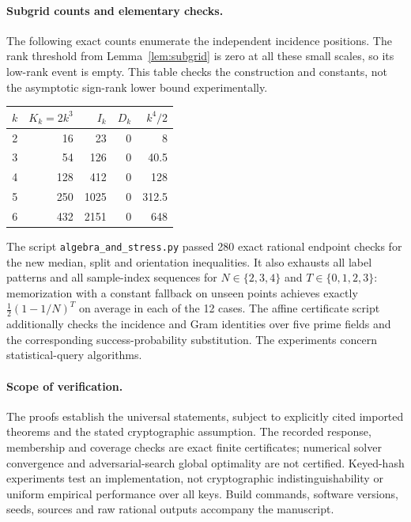 \paragraph{Subgrid counts and elementary checks.}
The following exact counts enumerate the independent incidence positions. The rank threshold from Lemma~\ref{lem:subgrid} is zero at all these small scales, so its low-rank event is empty. This table checks the construction and constants, not the asymptotic sign-rank lower bound experimentally.
\begin{center}
\begin{tabular}{rrrrr}
\toprule
$k$&$K_k=2k^3$&$I_k$&$D_k$&$k^4/2$\\
\midrule
2&16&23&0&8\\
3&54&126&0&40.5\\
4&128&412&0&128\\
5&250&1025&0&312.5\\
6&432&2151&0&648\\
\bottomrule
\end{tabular}
\end{center}
The script \texttt{algebra\_and\_stress.py} passed 280 exact rational endpoint checks for the new median, split and orientation inequalities. It also exhausts all label patterns and all sample-index sequences for $N\in\{2,3,4\}$ and $T\in\{0,1,2,3\}$: memorization with a constant fallback on unseen points achieves exactly $\tfrac12(1-1/N)^T$ on average in each of the 12 cases. The affine certificate script additionally checks the incidence and Gram identities over five prime fields and the corresponding success-probability substitution. The experiments concern statistical-query algorithms.

\paragraph{Scope of verification.}
The proofs establish the universal statements, subject to explicitly cited imported theorems and the stated cryptographic assumption. The recorded response, membership and coverage checks are exact finite certificates; numerical solver convergence and adversarial-search global optimality are not certified. Keyed-hash experiments test an implementation, not cryptographic indistinguishability or uniform empirical performance over all keys. Build commands, software versions, seeds, sources and raw rational outputs accompany the manuscript.
